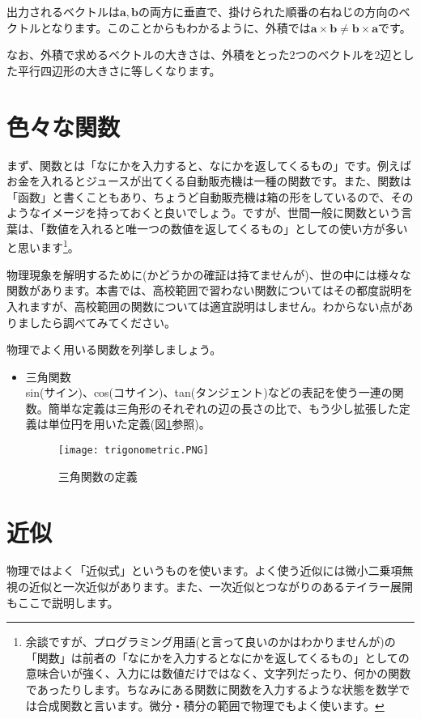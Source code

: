 出力されるベクトルは$\bm{a},\bm{b}$の両方に垂直で、掛けられた順番の右ねじの方向のベクトルとなります。このことからもわかるように、外積では$\bm{a}\times\bm{b}\neq\bm{b}\times\bm{a}$です。

なお、外積で求めるベクトルの大きさは、外積をとった2つのベクトルを2辺とした平行四辺形の大きさに等しくなります。




\section{色々な関数}
\label{function}
まず、関数とは「なにかを入力すると、なにかを返してくるもの」です。例えばお金を入れるとジュースが出てくる自動販売機は一種の関数です。また、関数は「函数」と書くこともあり、ちょうど自動販売機は箱の形をしているので、そのようなイメージを持っておくと良いでしょう。ですが、世間一般に関数という言葉は、「数値を入れると唯一つの数値を返してくるもの」としての使い方が多いと思います\footnote{余談ですが、プログラミング用語(と言って良いのかはわかりませんが)の「関数」は前者の「なにかを入力するとなにかを返してくるもの」としての意味合いが強く、入力には数値だけではなく、文字列だったり、何かの関数であったりします。ちなみにある関数に関数を入力するような状態を数学では合成関数と言います。微分・積分の範囲で物理でもよく使います。}。

物理現象を解明するために(かどうかの確証は持てませんが)、世の中には様々な関数があります。本書では、高校範囲で習わない関数についてはその都度説明を入れますが、高校範囲の関数については適宜説明はしません。わからない点がありましたら調べてみてください。

物理でよく用いる関数を列挙しましょう。

\begin{itemize}
    \item 三角関数\\
        sin(サイン)、cos(コサイン)、tan(タンジェント)などの表記を使う一連の関数。簡単な定義は三角形のそれぞれの辺の長さの比で、もう少し拡張した定義は単位円を用いた定義(図\ref{fig:trigonometric}参照)。
        \begin{figure}[!ht]
            \centering
            \texttt{[image: trigonometric.PNG]}
            \caption{三角関数の定義}
            \label{fig:trigonometric}
        \end{figure}
        
\end{itemize}
\fi


\section{近似}
物理ではよく「近似式」というものを使います。よく使う近似には微小二乗項無視の近似と一次近似があります。また、一次近似とつながりのあるテイラー展開もここで説明します。


